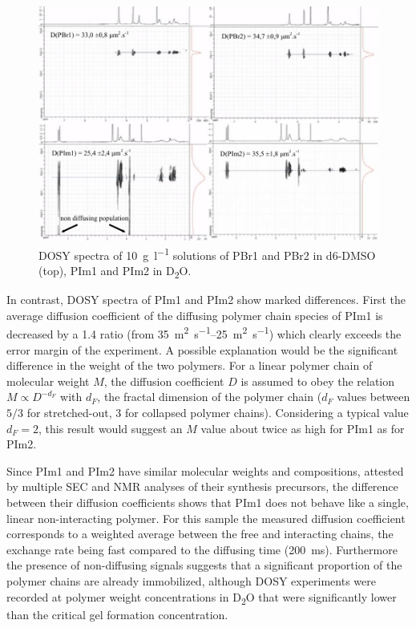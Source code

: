 \documentclass[prl,a4paper,twocolumn,superscriptaddress,showkeys]{revtex4}
\begin{document}
\begin{figure}
\includegraphics[]{fig5}
\caption{DOSY spectra of \SI{10}{\gram\per\litre} solutions of PBr1 and PBr2 in d6-DMSO (top), PIm1 and PIm2 in D\textsubscript{2}O.}
\label{fig:DOSY}
\end{figure}

In contrast, DOSY spectra of PIm1 and PIm2 show marked differences. First the average diffusion coefficient of the diffusing polymer chain species of PIm1 is decreased by a 1.4 ratio (from \SIrange{35}{25}{\square\metre\per\second}) which clearly exceeds the error margin of the experiment. A possible explanation would be the significant difference in the weight of the two polymers. For a linear polymer chain of molecular weight $M$, the diffusion coefficient $D$ is assumed to obey the relation $M\propto D^{-d_F}$ with $d_F$, the fractal dimension of the polymer chain ($d_F$ values between $5/3$ for stretched-out, $3$ for collapsed polymer chains).  Considering a typical value $d_F = 2$, this result would suggest an $M$ value about twice as high for PIm1 as for PIm2.

Since PIm1 and PIm2 have similar molecular weights and compositions, attested by multiple SEC and NMR analyses of their synthesis precursors, the difference between their diffusion coefficients shows that PIm1 does not behave like a single, linear non-interacting polymer. For this sample the measured diffusion coefficient corresponds to a weighted average between the free and interacting chains, the exchange rate being fast compared to the diffusing time (\SI{200}{\milli\second}). Furthermore the presence of non-diffusing signals suggests that a significant proportion of the polymer chains are already immobilized, although DOSY experiments were recorded at polymer weight concentrations in D\textsubscript{2}O that were significantly lower than the critical gel formation concentration.
\end{document}
